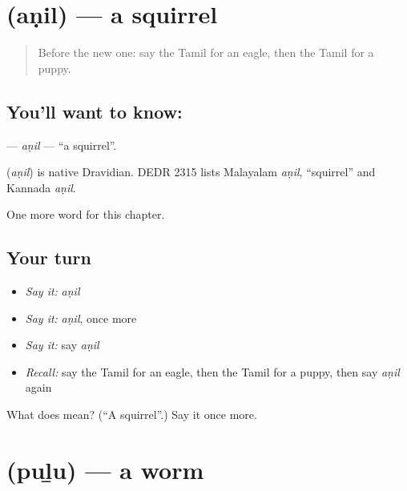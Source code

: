 \section[\texorpdfstring{\ta{அணில்} (aṇil)}{அணில் (aṇil)}]{ (aṇil) — a squirrel}

\label{lesson:TA-C247-anil}



\begin{quote}
Before the new one: say the Tamil for an eagle, then the Tamil for a puppy.
\end{quote}

\subsection*{You'll want to know: }
\textbf{} — \emph{aṇil} — \textquotedblleft{}a squirrel\textquotedblright{}.

\begin{cousinweb}
\textbf{} (\emph{aṇil}) is native Dravidian. DEDR 2315 lists Malayalam \emph{aṇil}, \textquotedblleft{}squirrel\textquotedblright{} and Kannada \emph{aṇil}.
\end{cousinweb}

\begin{grammarlens}[title={What you've built}]
One more word for this chapter.
\end{grammarlens}

\subsection*{Your turn}
\begin{itemize}
\raggedright
  \item \emph{Say it:} \emph{aṇil}
  \item \emph{Say it:} \emph{aṇil}, once more
  \item \emph{Say it:} say \emph{aṇil}
  \item \emph{Recall:} say the Tamil for an eagle, then the Tamil for a puppy, then say \emph{aṇil} again
\end{itemize}

\begin{tcolorbox}[breakable,colback=teal!4,colframe=teal!35!black,title={Before you move on}]
What does  mean? (\textquotedblleft{}A squirrel\textquotedblright{}.) Say it once more.
\end{tcolorbox}
\section[\texorpdfstring{\ta{புழு} (puḻu)}{புழு (puḻu)}]{ (puḻu) — a worm}

